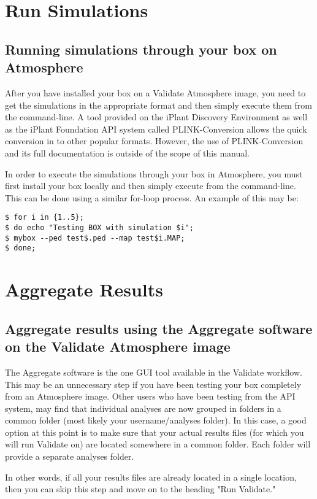 \documentclass[twoside,a4paper]{refart}
\begin{document}
\section{Run Simulations}
\subsection{Running simulations through your box on Atmosphere}
After you have installed your box on a Validate Atmosphere image, you need to get the simulations in the appropriate format and then simply execute them from the command-line. A tool provided on the iPlant Discovery Environment as well as the iPlant Foundation API system called PLINK-Conversion allows the quick conversion in to other popular formats. However, the use of PLINK-Conversion and its full documentation is outside of the scope of this manual.

In order to execute the simulations through your box in Atmosphere, you must first install your box locally and then simply execute from the command-line. This can be done using a similar for-loop process. An example of this may be:

\begin{lstlisting}[frame=single]
$ for i in {1..5};
$ do echo "Testing BOX with simulation $i";
$ mybox --ped test$.ped --map test$i.MAP;
$ done;
\end{lstlisting} 

\section{Aggregate Results}
\subsection{Aggregate results using the Aggregate software on the Validate Atmosphere image}

The Aggregate software is the one GUI tool available in the Validate workflow. This may be an unnecessary step if you have been testing your box completely from an Atmosphere image. Other users who have been testing from the API system, may find that individual analyses are now grouped in folders in a common folder (most likely your username/analyses folder). In this case, a good option at this point is to make sure that your actual results files (for which you will run Validate on) are located somewhere in a common folder. Each folder will provide a separate analyses folder. 

In other words, if all your results files are already located in a single location, then you can skip this step and move on to the heading "Run Validate."
\end{document}
